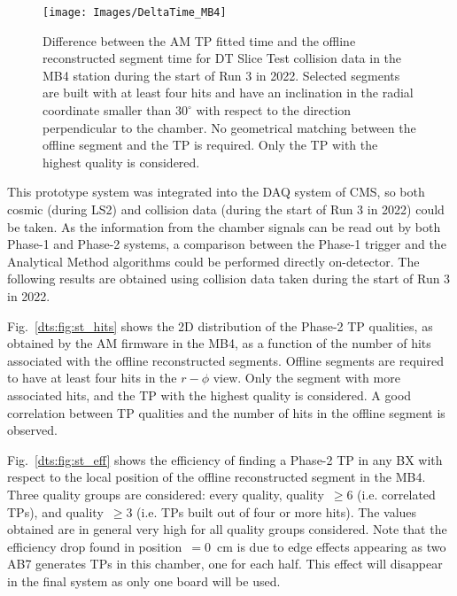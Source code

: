 \documentclass[../main.tex]{subfiles}
\begin{document}
\begin{figure}[t!]
\begin{center}
\texttt{[image: Images/DeltaTime\_MB4]}
\end{center}
\caption[Algorithm time resolution with respect to offline segments]{Difference between the AM TP fitted time and the offline reconstructed segment time for DT Slice Test collision data in the MB4 station during the start of Run 3 in 2022. Selected segments are built with at least four hits and have an inclination in the radial coordinate smaller than $30^\circ$ with respect to the direction perpendicular to the chamber. No geometrical matching between the offline segment and the TP is required. Only the TP with the highest quality is considered.}
\label{dts:fig:st_time}
\end{figure}






This prototype system was integrated into the DAQ system of CMS, so both cosmic (during LS2) and collision data (during the start of Run 3 in 2022) could be taken. As the information from the chamber signals can be read out by both Phase-1 and Phase-2 systems, a comparison between the Phase-1 trigger and the Analytical Method algorithms could be performed directly on-detector. The following results are obtained using collision data taken during the start of Run 3 in 2022.

Fig.~\ref{dts:fig:st_hits} shows the 2D distribution of the Phase-2 TP qualities, as obtained by the AM firmware in the MB4, as a function of the number of hits associated with the offline reconstructed segments. Offline segments are required to have at least four hits in the $r-\phi$ view. Only the segment with more associated hits, and the TP with the highest quality is considered. A good correlation between TP qualities and the number of hits in the offline segment is observed.

Fig.~\ref{dts:fig:st_eff} shows the efficiency of finding a Phase-2 TP in any BX with respect to the local position of the offline reconstructed segment in the MB4. Three quality groups are considered: every quality, quality~$\geq 6$ (i.e. correlated TPs), and quality~$\geq 3$ (i.e. TPs built out of four or more hits). The values obtained are in general very high for all quality groups considered. Note that the efficiency drop found in position~$=0$~cm is due to edge effects appearing as two AB7 generates TPs in this chamber, one for each half. This effect will disappear in the final system as only one board will be used.
\end{document}
